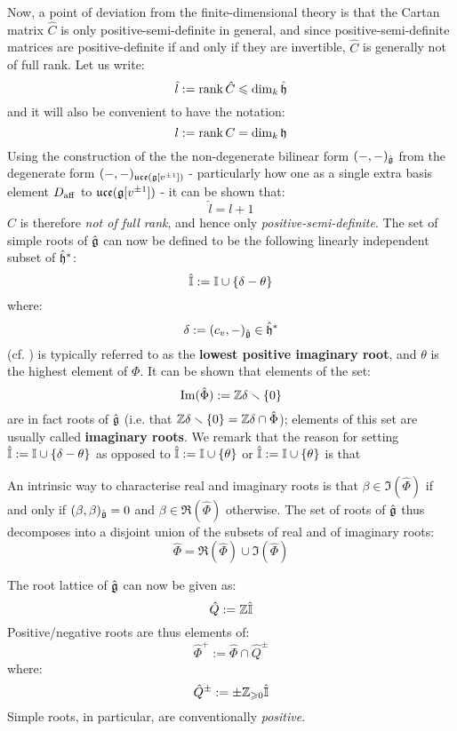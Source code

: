         Now, a point of deviation from the finite-dimensional theory is that the Cartan matrix $\hat{C}$ is only positive-semi-definite in general, and since positive-semi-definite matrices are positive-definite if and only if they are invertible, $\hat{C}$ is generally not of full rank. Let us write:
            $$\hat{l} := \operatorname{rank} \hat{C} \leqslant \dim_k \hat{\mathfrak{h}}$$
        and it will also be convenient to have the notation:
            $$l := \operatorname{rank} C = \dim_k \mathfrak{h}$$
        Using the construction of the the non-degenerate bilinear form $(-, -)_{\hat{\mathfrak{g}}}$ from the degenerate form $(-, -)_{\mathfrak{uce}(\mathfrak{g}[v^{\pm 1}])}$ - particularly how one as a single extra basis element $D_{\mathrm{aff}}$ to $\mathfrak{uce}(\mathfrak{g}[v^{\pm 1}])$ - it can be shown that:
            $$\hat{l} = l + 1$$
        $\hat{C}$ is therefore \textit{not of full rank}, and hence only \textit{positive-semi-definite}. The set of simple roots of $\hat{\mathfrak{g}}$ can now be defined to be the following linearly independent subset of $\hat{\mathfrak{h}}^*$:
            $$\hat{\mathbb{I}} := \mathbb{I} \cup \{\delta - \theta\}$$
        where:
            $$\delta := (c_v, -)_{\hat{\mathfrak{g}}} \in \hat{\mathfrak{h}}^*$$
        (cf. \cite[Section 7.4, p. 100]{kac_infinite_dimensional_lie_algebras}) is typically referred to as the \textbf{lowest positive imaginary root}, and $\theta$ is the highest element of $\Phi$. It can be shown that elements of the set:
            $$\operatorname{Im}(\hat{\Phi}) := \mathbb{Z}\delta \smallsetminus \{0\}$$
        are in fact roots of $\hat{\mathfrak{g}}$ (i.e. that $\mathbb{Z}\delta \smallsetminus \{0\} = \mathbb{Z}\delta \cap \hat{\Phi}$); elements of this set are usually called \textbf{imaginary roots}. We remark that the reason for setting $\hat{\mathbb{I}} := \mathbb{I} \cup \{\delta - \theta\}$ as opposed to $\hat{\mathbb{I}} := \mathbb{I} \cup \{\theta\}$ or $\hat{\mathbb{I}} := \mathbb{I} \cup \{\theta\}$ is that 

        An intrinsic way to characterise real and imaginary roots is that $\beta \in \Im(\hat{\Phi})$ if and only if $(\beta, \beta)_{\hat{\mathfrak{g}}} = 0$ and $\beta \in \Re(\hat{\Phi})$ otherwise. The set of roots of $\hat{\mathfrak{g}}$ thus decomposes into a disjoint union of the subsets of real and of imaginary roots:
            $$\hat{\Phi} = \Re(\hat{\Phi}) \cup \Im(\hat{\Phi})$$
        
        The root lattice of $\hat{\mathfrak{g}}$ can now be given as:
            $$\hat{Q} := \mathbb{Z}\hat{\mathbb{I}}$$
        Positive/negative roots are thus elements of:
            $$\hat{\Phi}^+ := \hat{\Phi} \cap \hat{Q}^{\pm}$$
        where:
            $$\hat{Q}^{\pm} := \pm\mathbb{Z}_{\geqslant 0}\hat{\mathbb{I}}$$
        Simple roots, in particular, are conventionally \textit{positive}.

